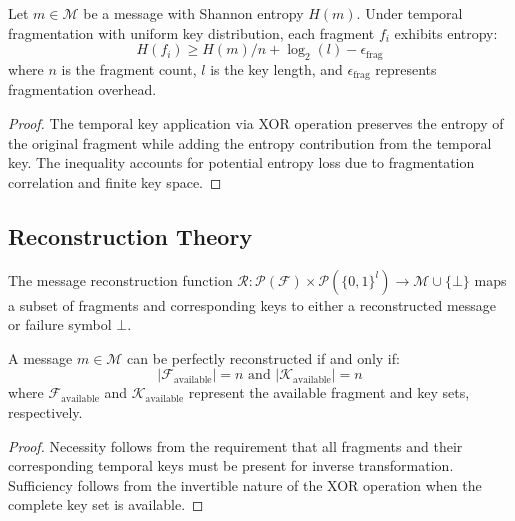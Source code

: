 \begin{theorem}
Let $m \in \mathcal{M}$ be a message with Shannon entropy $H(m)$. Under temporal fragmentation with uniform key distribution, each fragment $f_i$ exhibits entropy:
\begin{equation}
H(f_i) \geq H(m)/n + \log_2(l) - \epsilon_{\text{frag}}
\end{equation}
where $n$ is the fragment count, $l$ is the key length, and $\epsilon_{\text{frag}}$ represents fragmentation overhead.
\end{theorem}

\begin{proof}
The temporal key application via XOR operation preserves the entropy of the original fragment while adding the entropy contribution from the temporal key. The inequality accounts for potential entropy loss due to fragmentation correlation and finite key space.
\end{proof}

\subsection{Reconstruction Theory}

\begin{definition}
The message reconstruction function $\mathcal{R}: \mathcal{P}(\mathcal{F}) \times \mathcal{P}(\{0,1\}^l) \to \mathcal{M} \cup \{\bot\}$ maps a subset of fragments and corresponding keys to either a reconstructed message or failure symbol $\bot$.
\end{definition}

\begin{theorem}
A message $m \in \mathcal{M}$ can be perfectly reconstructed if and only if:
\begin{equation}
|\mathcal{F}_{\text{available}}| = n \text{ and } |\mathcal{K}_{\text{available}}| = n
\end{equation}
where $\mathcal{F}_{\text{available}}$ and $\mathcal{K}_{\text{available}}$ represent the available fragment and key sets, respectively.
\end{theorem}

\begin{proof}
Necessity follows from the requirement that all fragments and their corresponding temporal keys must be present for inverse transformation. Sufficiency follows from the invertible nature of the XOR operation when the complete key set is available.
\end{proof}

